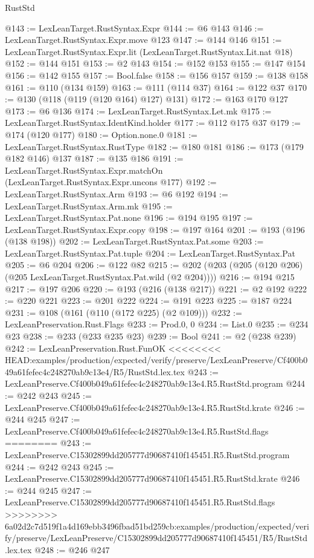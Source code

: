\begin{lexlean}{RustStd}
\begin{coremodule}
{\begin{coremodule}
{{{{{{@143 := LexLeanTarget.RustSyntax.Expr
@144 := @6 @143
@146 := LexLeanTarget.RustSyntax.Expr.move @123
@147 := @144 @146
@151 := LexLeanTarget.RustSyntax.Expr.lit (LexLeanTarget.RustSyntax.Lit.nat @18)
@152 := @144 @151
@153 := @2 @143
@154 := @152 @153
@155 := @147 @154
@156 := @142 @155
@157 := Bool.false
@158 := @156 @157
@159 := @138 @158
@161 := @110 (@134 @159)
@163 := @111 (@114 @37)
@164 := @122 @37
@170 := @130 (@118 (@119 (@120 @164) @127) @131)
@172 := @163 @170 @127
@173 := @6 @136
@174 := LexLeanTarget.RustSyntax.Let.mk
@175 := LexLeanTarget.RustSyntax.IdentKind.holder
@177 := @112 @175 @37
@179 := @174 (@120 @177)
@180 := Option.none.{0}
@181 := LexLeanTarget.RustSyntax.RustType
@182 := @180 @181
@186 := @173 (@179 @182 @146) @137
@187 := @135 @186
@191 := LexLeanTarget.RustSyntax.Expr.matchOn (LexLeanTarget.RustSyntax.Expr.uncons @177)
@192 := LexLeanTarget.RustSyntax.Arm
@193 := @6 @192
@194 := LexLeanTarget.RustSyntax.Arm.mk
@195 := LexLeanTarget.RustSyntax.Pat.none
@196 := @194 @195
@197 := LexLeanTarget.RustSyntax.Expr.copy
@198 := @197 @164
@201 := @193 (@196 (@138 @198))
@202 := LexLeanTarget.RustSyntax.Pat.some
@203 := LexLeanTarget.RustSyntax.Pat.tuple
@204 := LexLeanTarget.RustSyntax.Pat
@205 := @6 @204
@206 := @122 @82
@215 := @202 (@203 (@205 (@120 @206) (@205 LexLeanTarget.RustSyntax.Pat.wild (@2 @204))))
@216 := @194 @215
@217 := @197 @206
@220 := @193 (@216 (@138 @217))
@221 := @2 @192
@222 := @220 @221
@223 := @201 @222
@224 := @191 @223
@225 := @187 @224
@231 := @108 (@161 (@110 (@172 @225) (@2 @109)))
@232 := LexLeanPreservation.Rust.Flags
@233 := Prod.{0, 0}
@234 := List.{0}
@235 := @234 @23
@238 := @233 (@233 @235 @23)
@239 := Bool
@241 := @2 (@238 @239)
@242 := LexLeanPreservation.Rust.FunOK
<<<<<<<< HEAD:examples/production/expected/verify/preserve/LexLeanPreserve/Cf400b049a61fefec4c248270ab9c13e4/R5/RustStd.lex.tex
@243 := LexLeanPreserve.Cf400b049a61fefec4c248270ab9c13e4.R5.RustStd.program
@244 := @242 @243
@245 := LexLeanPreserve.Cf400b049a61fefec4c248270ab9c13e4.R5.RustStd.krate
@246 := @244 @245
@247 := LexLeanPreserve.Cf400b049a61fefec4c248270ab9c13e4.R5.RustStd.flags
========
@243 := LexLeanPreserve.C15302899dd205777d90687410f145451.R5.RustStd.program
@244 := @242 @243
@245 := LexLeanPreserve.C15302899dd205777d90687410f145451.R5.RustStd.krate
@246 := @244 @245
@247 := LexLeanPreserve.C15302899dd205777d90687410f145451.R5.RustStd.flags
>>>>>>>> 6a02d2c7d519f1a4d169ebb3496fbad51bd259cb:examples/production/expected/verify/preserve/LexLeanPreserve/C15302899dd205777d90687410f145451/R5/RustStd.lex.tex
@248 := @246 @247
}}}}}}
\end{coremodule}}
\end{coremodule}
\end{lexlean}
